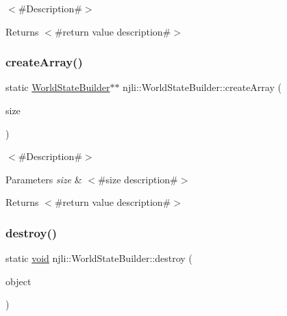 $<$\#\+Description\#$>$

\begin{DoxyReturn}{Returns}
$<$\#return value description\#$>$ 
\end{DoxyReturn}
\mbox{\label{classnjli_1_1_world_state_builder_a5acea112eba6514219c5be05ea03664b}} 
\subsubsection{\texorpdfstring{create\+Array()}{createArray()}}
{\footnotesize\ttfamily static \mbox{\hyperlink{classnjli_1_1_world_state_builder}{World\+State\+Builder}}$\ast$$\ast$ njli\+::\+World\+State\+Builder\+::create\+Array (\begin{DoxyParamCaption}\item[{const \mbox{\hyperlink{_util_8h_a10e94b422ef0c20dcdec20d31a1f5049}{u32}}}]{size }\end{DoxyParamCaption})\hspace{0.3cm}{\ttfamily [static]}}

$<$\#\+Description\#$>$


\begin{DoxyParams}{Parameters}
{\em size} & $<$\#size description\#$>$\\
\hline
\end{DoxyParams}
\begin{DoxyReturn}{Returns}
$<$\#return value description\#$>$ 
\end{DoxyReturn}
\mbox{\label{classnjli_1_1_world_state_builder_acfd409fa70a10bdcd8d7d9525fe98574}} 
\subsubsection{\texorpdfstring{destroy()}{destroy()}}
{\footnotesize\ttfamily static \mbox{\hyperlink{_thread_8h_af1e856da2e658414cb2456cb6f7ebc66}{void}} njli\+::\+World\+State\+Builder\+::destroy (\begin{DoxyParamCaption}\item[{\mbox{\hyperlink{classnjli_1_1_world_state_builder}{World\+State\+Builder}} $\ast$}]{object }\end{DoxyParamCaption})\hspace{0.3cm}{\ttfamily [static]}}

